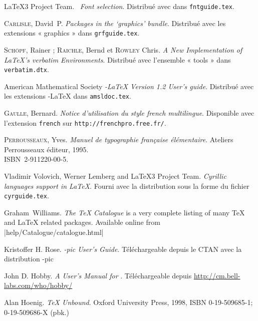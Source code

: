 \begin{thebibliography}{99}
 \LaTeX3 Project Team.  \newblock \emph{\LaTeXe~Font
    selection}.  \newblock Distribué avec \LaTeXe{} dans
  \texttt{fntguide.tex}.

 \textsc{Carlisle}, David~P. \newblock \emph{Packages in the
    `graphics' bundle}.  \newblock Distribué avec les extensions
    « graphics » dans \texttt{grfguide.tex}.

 \textsc{Schöpf}, Rainer ; \textsc{Raichle}, Bernd
    et \textsc{Rowley} Chris.
    \newblock \emph{A New Implementation of \LaTeX's verbatim
    Environments}.
    \newblock Distribué avec l'ensemble « tools » dans
    \texttt{verbatim.dtx}.

 American Mathematical Society \newblock
    \emph{\AmS-\LaTeX{} Version 1.2 User's guide}. \newblock Distribué
    avec les extensions \AmS-\LaTeX{} dans \texttt{amsldoc.tex}.

 \textsc{Gaulle}, Bernard. \newblock \emph{Notice
  d'utilisation du style french multilingue}. \newblock Disponible
  avec l'extension \texttt{french} sur \texttt{http://frenchpro.free.fr/}.

 \textsc{Perrousseaux}, Yves. \newblock \emph{Manuel de
  typographie française élémentaire}. \newblock Ateliers Perrousseaux
  éditeur, 1995.\\
  ISBN~2-911220-00-5.

 Vladimir Volovich, Werner Lemberg and \LaTeX3 Project Team.
    \newblock \emph{Cyrillic languages support in \LaTeX}.
    \newblock Fourni avec la distribution \LaTeXe{} sous la forme du
    fichier \texttt{cyrguide.tex}.

 Graham~Williams.  \newblock \emph{The TeX
    Catalogue} is a very complete listing of many \TeX{} and \LaTeX{}
    related packages.
  \newblock Available online from \CTAN|help/Catalogue/catalogue.html|

 Kristoffer H. Rose.
  \newblock \emph{\Xy-pic User's Guide}.  \newblock
  Téléchargeable depuis le CTAN avec la distribution \Xy-pic

 John D. Hobby.
  \newblock \emph{A User's Manual for \MP}. \newblock
  Téléchargeable depuis \url{http://cm.bell-labs.com/who/hobby/}

 Alan Hoenig.
  \newblock \emph{\TeX{} Unbound}. \newblock Oxford University Press, 1998,
    ISBN 0-19-509685-1; 0-19-509686-X (pbk.)


\end{thebibliography}
